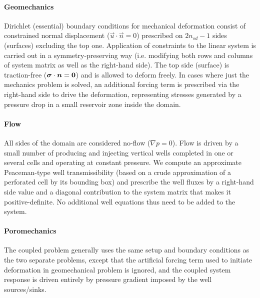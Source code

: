 \paragraph{Geomechanics}
Dirichlet (essential) boundary conditions for mechanical deformation consist of constrained normal displacement ($\vec{u} \cdot \vec{n} = 0$) prescribed on $2n_{sd}-1$ sides (surfaces) excluding the top one.   Application of constraints to the linear system is carried out in a symmetry-preserving way (i.e. modifying both rows and columns of system matrix as well as the right-hand side).   The top side (surface) is traction-free ($\bm{\sigma} \cdot \bm{n} = \bm{0}$) and is allowed to deform freely.   In cases where just the mechanics problem is solved, an additional forcing term is prescribed via the right-hand side to drive the deformation, representing stresses generated by a pressure drop in a small reservoir zone inside the domain.

\paragraph{Flow}
All sides of the domain are considered no-flow ($\nabla p = 0$).   Flow is driven by a small number of producing and injecting vertical wells completed in one or several cells and operating at constant pressure.   We compute an approximate Peaceman-type well transmissibility (based on a crude approximation of a perforated cell by its bounding box) and prescribe the well fluxes by a right-hand side value and a diagonal contribution to the system matrix that makes it positive-definite.   No additional well equations thus need to be added to the system.

\paragraph{Poromechanics}
The coupled problem generally uses the same setup and boundary conditions as the two separate problems, except that the artificial forcing term used to initiate deformation in geomechanical problem is ignored, and the coupled system response is driven entirely by pressure gradient imposed by the well sources/sinks.

